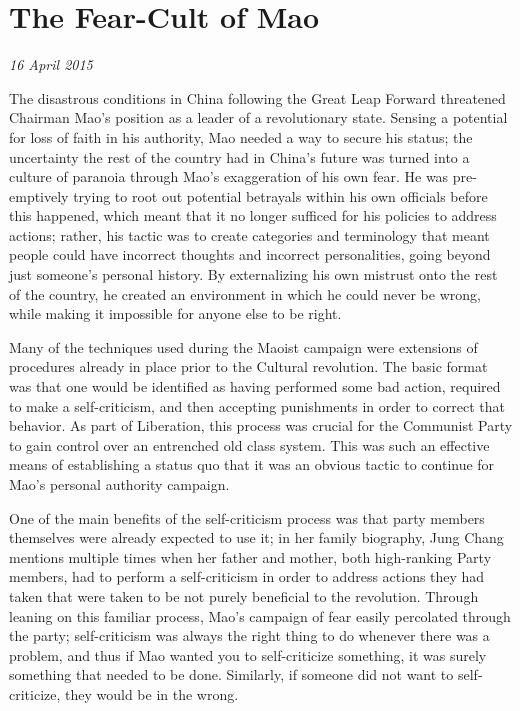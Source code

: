 \section{The Fear-Cult of Mao}

\textit{16 April 2015}

The disastrous conditions in China following the Great Leap Forward threatened
Chairman Mao's position as a leader of a revolutionary state. Sensing a
potential for loss of faith in his authority, Mao needed a way to secure his
status; the uncertainty the rest of the country had in China's future was turned
into a culture of paranoia through Mao's exaggeration of his own fear. He was
pre-emptively trying to root out potential betrayals within his own officials
before this happened, which meant that it no longer sufficed for his policies to
address actions; rather, his tactic was to create categories and terminology
that meant people could have incorrect thoughts and incorrect personalities,
going beyond just someone's personal history. By externalizing his own mistrust
onto the rest of the country, he created an environment in which he could never
be wrong, while making it impossible for anyone else to be right.

Many of the techniques used during the Maoist campaign were extensions of
procedures already in place prior to the Cultural revolution. The basic format
was that one would be identified as having performed some bad action, required
to make a self-criticism, and then accepting punishments in order to correct
that behavior. As part of Liberation, this process was crucial for the Communist
Party to gain control over an entrenched old class system. This was such an
effective means of establishing a status quo that it was an obvious tactic to
continue for Mao's personal authority campaign.

One of the main benefits of the self-criticism process was that party members
themselves were already expected to use it; in her family biography, Jung Chang
mentions multiple times when her father and mother, both high-ranking Party
members, had to perform a self-criticism in order to address actions they had
taken that were taken to be not purely beneficial to the revolution. Through
leaning on this familiar process, Mao's campaign of fear easily percolated
through the party; self-criticism was always the right thing to do whenever
there was a problem, and thus if Mao wanted you to self-criticize something, it
was surely something that needed to be done. Similarly, if someone did not want
to self-criticize, they would be in the wrong.

